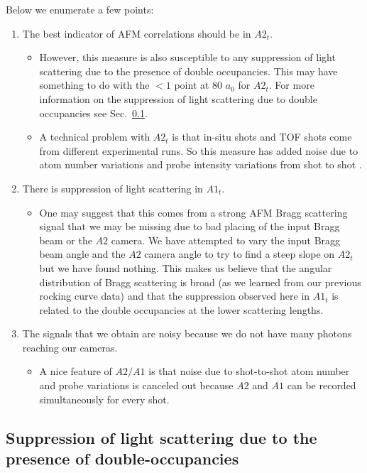 \documentclass[11pt,letter]{article}
\begin{document}
Below we enumerate a few points:
\begin{enumerate}
 \item  The best indicator of AFM correlations should be in $A2_{t}$. 
    \begin{itemize}
    \item  However, this measure is also susceptible to any suppression of light
scattering due to the presence of double occupancies.  This may have something
to do with the $<1$ point at 80 $a_{0}$ for $A2_{t}$.  For more information on the suppression of light scattering due to double occupancies see Sec.~\ref{sec:suppression}.
    \item A technical problem with $A2_{t}$ is that in-situ shots and TOF shots
come from different experimental runs.  So this measure has added noise due to
atom number variations and probe intensity variations from shot to shot .  
     \end{itemize}
 \item  There is suppression of light scattering in $A1_{t}$.   
    \begin{itemize}
    \item One may suggest that this comes 
from a strong AFM Bragg scattering signal that we may be missing due to bad
placing of the input Bragg beam or the $A2$ camera.  We have attempted to vary
the input Bragg beam angle and the $A2$ camera angle to try to find a steep
slope on $A2_{t}$ but we have found nothing.  This makes us believe that the
angular distribution of Bragg scattering is broad (as we learned from our
previous rocking curve data) and that the suppression observed here in $A1_{t}$
is related to the double occupancies at the lower scattering lengths.  
    \end{itemize}
\item  The signals that we obtain are noisy because we do not have many photons
reaching our cameras.  
    \begin{itemize}
       \item A nice feature of $A2/A1$ is that noise due to shot-to-shot atom
number and probe variations is canceled out because $A2$ and $A1$ can be
recorded simultaneously for every shot.  
    \end{itemize}
\end{enumerate}

\subsection{Suppression of light scattering due to the presence of double-occupancies}
\label{sec:suppression} 
\end{document}
